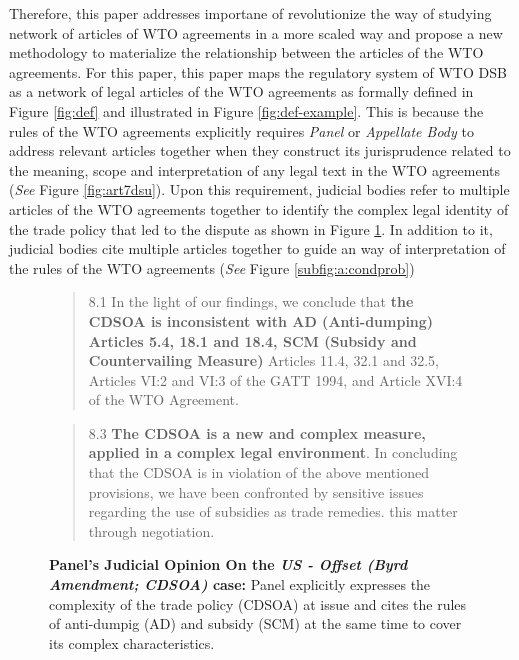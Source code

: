Therefore, this paper addresses importane of revolutionize the way of studying network of articles of WTO agreements in a more scaled way and propose a new methodology to
materialize the relationship between the articles of the WTO agreements. 
For this paper, this paper maps
the regulatory system of WTO DSB
as a network of legal articles
of the WTO agreements as formally defined in Figure \ref{fig:def} and illustrated in Figure \ref{fig:def-example}. This is because the rules of the WTO agreements
explicitly requires \textit{Panel} or \textit{Appellate Body} to address
relevant articles together when they construct its jurisprudence related to the meaning, scope and interpretation of any legal text in the WTO agreements (\textit{See} Figure \ref{fig:art7dsu}).
Upon this requirement, judicial bodies refer to
multiple articles of the WTO agreements together
to identify the complex legal identity of the trade policy that led to the dispute as shown in Figure \ref{fig:complex-measure}.
In addition to it, judicial bodies cite multiple articles together
to guide an way of interpretation of the rules of the WTO agreements (\textit{See} Figure \ref{subfig:a:condprob})




\begin{figure}[h]
    \begin{quote}
        8.1 In the light of our findings, we conclude that \textbf{the CDSOA is inconsistent with AD (Anti-dumping)
        Articles 5.4, 18.1 and 18.4, SCM (Subsidy and Countervailing Measure)} Articles 11.4, 32.1 and 32.5, Articles VI:2 and VI:3 of the GATT
        1994, and Article XVI:4 of the WTO Agreement.
    \end{quote} 
    \begin{quote}
        \centering{\ldots}
    \end{quote}
    \begin{quote}
        8.3 \textbf{The CDSOA is a new and complex measure, applied in a complex legal environment}. In
        concluding that the CDSOA is in violation of the above mentioned provisions, we have been
        confronted by sensitive issues regarding the use of subsidies as trade remedies.
        this matter through negotiation.
    \end{quote} 
    \caption{\textbf{Panel's Judicial Opinion On the \textit{US - Offset (Byrd Amendment; CDSOA)} case:} Panel explicitly expresses the complexity of the trade policy (CDSOA) at issue and cites the rules of anti-dumpig (AD) and subsidy (SCM) at the same time to cover its complex characteristics.}
    \label{fig:complex-measure}
\end{figure}

